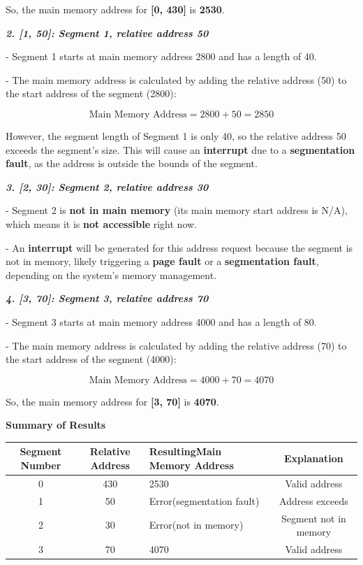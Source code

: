 \documentclass[a4paper]{book}
\begin{document}
So, the main memory address for \textbf{[0, 430]} is \textbf{2530}.

\textit{\textbf{2. \textbf{[1, 50]}: Segment 1, relative address 50}}

- Segment 1 starts at main memory address 2800 and has a length of 40.

- The main memory address is calculated by adding the relative address (50) to the start address of the segment (2800):
  
\[
\text{Main Memory Address} = 2800 + 50 = 2850
\]

However, the segment length of Segment 1 is only 40, so the relative address 50 exceeds the segment’s size. This will cause an \textbf{interrupt} due to a \textbf{segmentation fault}, as the address is outside the bounds of the segment.

\textit{\textbf{3. \textbf{[2, 30]}: Segment 2, relative address 30}}

- Segment 2 is \textbf{not in main memory} (its main memory start address is N/A), which means it is \textbf{not accessible} right now.

- An \textbf{interrupt} will be generated for this address request because the segment is not in memory, likely triggering a \textbf{page fault} or a \textbf{segmentation fault}, depending on the system's memory management.

\textit{\textbf{4. \textbf{[3, 70]}: Segment 3, relative address 70}}

- Segment 3 starts at main memory address 4000 and has a length of 80.

- The main memory address is calculated by adding the relative address (70) to the start address of the segment (4000):
  
\[
\text{Main Memory Address} = 4000 + 70 = 4070
\]

So, the main memory address for \textbf{[3, 70]} is \textbf{4070}.

\textbf{Summary of Results}

\vspace{0.5cm}
\begin{tabular}{|c|c|p{4cm}|c|}
    \hline
    Segment Number & Relative Address & Resulting\newline Main Memory Address & Explanation \\ \hline
    0   & 430   & 2530  & Valid address \\ \hline
    1   & 50    & Error\newline(segmentation fault)  & Address exceeds \\ \hline
	2   & 30   & Error\newline(not in memory) & Segment not in memory  \\ \hline
	3   & 70    & 4070  & Valid address \\ \hline
\end{tabular}
\end{document}
